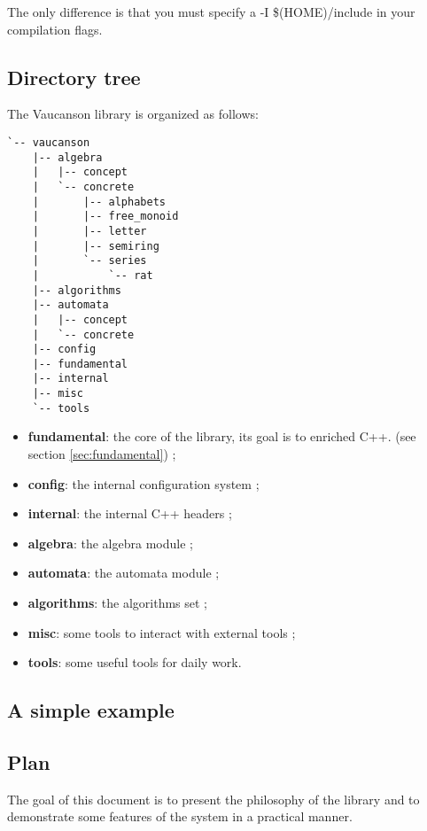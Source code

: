\documentclass{article}
\begin{document}
The only difference is that you must specify a -I \$(HOME)/include in
your compilation flags.

\subsection{Directory tree}

The Vaucanson library is organized as follows: 

\begin{verbatim}
`-- vaucanson
    |-- algebra
    |   |-- concept
    |   `-- concrete
    |       |-- alphabets
    |       |-- free_monoid
    |       |-- letter
    |       |-- semiring
    |       `-- series
    |           `-- rat
    |-- algorithms
    |-- automata
    |   |-- concept
    |   `-- concrete
    |-- config
    |-- fundamental
    |-- internal
    |-- misc
    `-- tools
\end{verbatim}

\begin{itemize}
\item \textbf{fundamental}: the core of the library, its goal is to
  enriched C++. (see section \ref{sec:fundamental}) ;

\item \textbf{config}: the internal configuration system ;
\item \textbf{internal}: the internal C++ headers ;
\item \textbf{algebra}: the algebra module ;
\item \textbf{automata}: the automata module ;
\item \textbf{algorithms}: the algorithms set ;
\item \textbf{misc}: some tools to interact with external tools ;
\item \textbf{tools}: some useful tools for daily work.
\end{itemize}

\subsection{A simple example}


\subsection{Plan}

The goal of this document is to present the philosophy of the library
and to demonstrate some features of the system in a practical manner.
\end{document}
